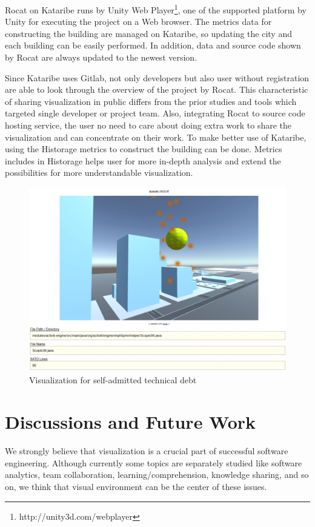 \documentclass[conference]{IEEEtran}
\begin{document}
Rocat on Kataribe runs by Unity Web Player\footnote{http://unity3d.com/webplayer}, one of the supported platform by Unity for executing the project on a Web browser.
The metrics data for constructing the building are managed on Kataribe, so updating the city and each building can be easily performed.
In addition, data and source code shown by Rocat are always updated to the newest version.

Since Kataribe uses Gitlab, not only developers but also user without registration are able to look through the overview of the project by Rocat.
This characteristic of sharing visualization in public differs from the prior studies and tools which targeted single developer or project team.
Also, integrating Rocat to source code hosting service, the user no need to care about doing extra work to share the visualization and can concentrate on their work.
To make better use of Kataribe, using the Historage metrics to construct the building can be done.
Metrics includes in Historage helps user for more in-depth analysis and extend the possibilities for more understandable visualization.


\begin{figure}[tb]
\centering
\includegraphics[width=\linewidth]{satd.pdf}
\caption{Visualization for self-admitted technical debt}
\label{figure:SATD}
\end{figure}

\section{Discussions and Future Work}
We strongly believe that visualization is a crucial part of successful software engineering.
Although currently some topics are separately studied like software analytics, team collaboration, learning/comprehension, knowledge sharing, and so on, we think that visual environment can be the center of these issues.
\end{document}
